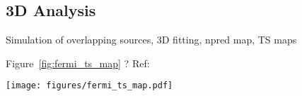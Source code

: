 \subsection{3D Analysis}
\label{ssec:3d-analysis}


Simulation of overlapping sources, 3D fitting, npred map, TS maps

 Figure~\ref{fig:fermi_ts_map} ?
Ref:~\citep{Stewart2009} \begin{figure*}[t] \centering
	\texttt{[image: figures/fermi\_ts\_map.pdf]}
	\caption{Fermi-LAT TS map in two energy bands} \label{fig:fermi_ts_map}
\end{figure*}
